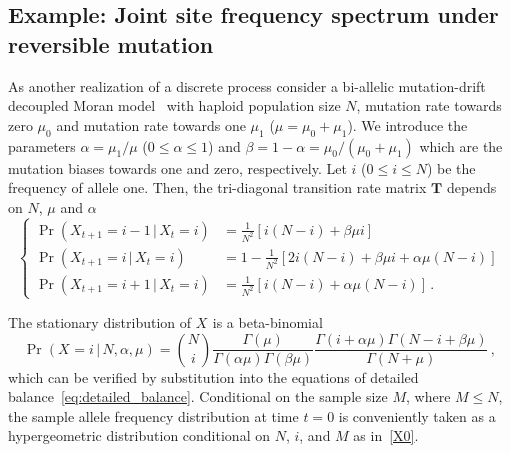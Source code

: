 \documentclass[preprint]{elsarticle}
\newcommand\given{{\,|\,}}
\newcommand\x[1]{\ensuremath{X_{#1}}}
\begin{document}
\subsection{Example: Joint site frequency spectrum under reversible mutation}\label{section:discr_rev_general}
As another realization of a discrete process consider a bi-allelic mutation-drift decoupled Moran model~\citep{Baak08,Ethe09} with haploid population size $N$, mutation rate towards zero $\mu_0$ and mutation rate towards one $\mu_1$ ($\mu=\mu_0+\mu_1$).  We introduce the parameters $\alpha=\mu_1/\mu$ ($0 \leq \alpha \leq 1$) and $\beta=1-\alpha=\mu_0/(\mu_0+\mu_1)$ which are the mutation biases towards one and zero, respectively.  Let $i$ ($0\leq i\leq N$) be the frequency of allele one. Then, the tri-diagonal transition rate matrix $\mathbf{T}$ depends on $N$, $\mu$ and $\alpha$
\begin{equation}\label{eq:transition_decoupled_Moran}
\begin{cases}
\Pr(\x{t+1}=i-1\given \x{t}=i)&=\frac1{N^2}\left[i(N-i)+\beta\mu i\right]\\
    \Pr(\x{t+1}=i\given \x{t}=i)&=1-\frac1{N^2}\left[2i(N-i)+\beta\mu i + \alpha\mu (N-i) \right]\\
\Pr(\x{t+1}=i+1\given \x{t}=i)&=\frac1{N^2}\left[i(N-i)+\alpha\mu (N-i)\right]\,.
\end{cases}
\end{equation}

The stationary distribution of $\x{}$ is a beta-binomial
\begin{equation}\label{beta_bin}
\Pr(\x{}=i\given N,\alpha,\mu)=\binom{N}{i}
\frac{\Gamma(\mu)}{\Gamma(\alpha\mu)\Gamma(\beta\mu)}
\frac{\Gamma(i+\alpha\mu)\Gamma(N-i+\beta\mu)}{\Gamma(N+\mu)}\,,
\end{equation}
which can be verified by substitution into the equations of detailed balance~\eqref{eq:detailed_balance}. 
Conditional on the sample size $M$, where $M\leq N$, the sample allele frequency distribution at time $t=0$ is conveniently taken as a hypergeometric distribution conditional on $N$, $i$, and $M$ as in~\eqref{X0}.

\end{document}
